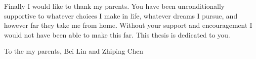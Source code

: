 Finally I would like to thank my parents. You have
been unconditionally supportive to whatever choices I make in life, whatever
dreams I pursue, and however far they take me from home. Without your support and
encouragement I would not have been able to make this far. This thesis is
dedicated to you.

\newpage \vspace*{8cm}
\begin{center}
\large To the my parents, Bei Lin and Zhiping Chen
\end{center}
